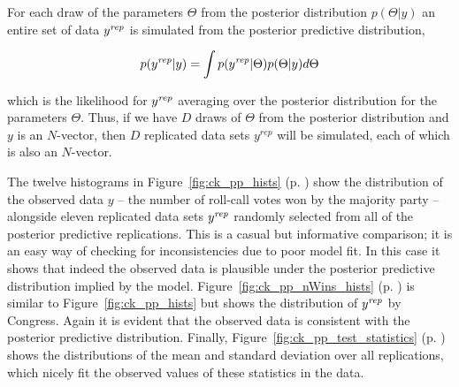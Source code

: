 For each draw of the parameters $\Theta$ from the posterior distribution $p(\Theta | y)$ an entire set of data $y^{\it rep} $ is simulated from the posterior predictive distribution,

\begin{equation*}
 p(y^{\it rep} | y) = \int p(y^{\it rep} | \Theta) p(\Theta | y) d\Theta
\end{equation*}

\noindent which is the likelihood for $y^{\it rep}$ averaging over the posterior distribution for the parameters $\Theta$. Thus, if we have $D$ draws of $\Theta$ from the posterior distribution and $y$ is an $N$-vector, then $D$ replicated data sets $y^{rep}$ will be simulated, each of which is also an $N$-vector.

The twelve histograms in Figure~\ref{fig:ck_pp_hists} (p. \pageref{fig:ck_pp_hists}) show the distribution of the observed data $y$ -- the number of roll-call votes won by the majority party -- alongside eleven replicated data sets $y^{\it rep}$ randomly selected from all of the posterior predictive replications. This is a casual but informative comparison; it is an easy way of checking for inconsistencies due to poor model fit. In this case it shows that indeed the observed data is plausible under the posterior predictive distribution implied by the model. Figure~\ref{fig:ck_pp_nWins_hists} (p. \pageref{fig:ck_pp_nWins_hists}) is similar to Figure~\ref{fig:ck_pp_hists} but shows the distribution of $y^{\it rep}$ by Congress. Again it is evident that the observed data is consistent with the posterior predictive distribution. Finally, Figure~\ref{fig:ck_pp_test_statistics} (p. \pageref{fig:ck_pp_test_statistics}) shows the distributions of the mean and standard deviation over all replications, which nicely fit the observed values of these statistics in the data. 


